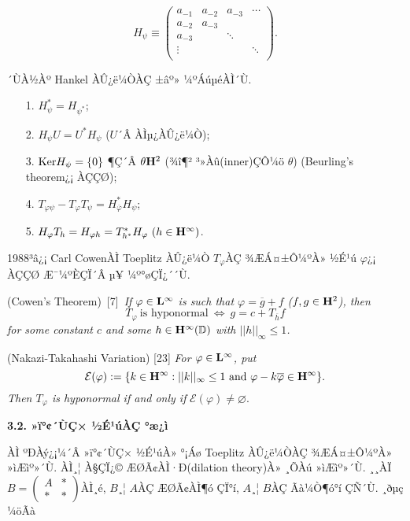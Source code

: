 \documentclass[12pt,a4paper,2sided]{article}
\newcommand{\vs}{\vspace}
\begin{document}
$$
H_\psi \equiv
\begin{pmatrix}
a_{-1}&a_{-2}&a_{-3}&\cdots\\
a_{-2}&a_{-3}& & \\
a_{-3}& &\ddots&  \\
\vdots& & &\ddots \\
\end{pmatrix}.
$$

´ÙÀ½Àº Hankel ÀÛ¿ë¼ÒÀÇ ±âº» ¼ºÁúµéÀÌ´Ù.
\begin{itemize}
\item[1.]  $H_{\psi}^*=H_{{\psi}^*}$;
\item[2.]  $H_{\psi}U=U^*H_{\psi}$ ($U$´Â ÀÌµ¿ÀÛ¿ë¼Ò);
\item[3.]  ${\rm Ker}H_{\psi}=\{0\}$ ¶Ç´Â $\theta{\bold H}^2$ (¾î¶² ³»Àû(inner)ÇÔ¼ö $\theta$) (Beurling's theorem¿¡ ÀÇÇØ);
\item[4.]  $T_{\varphi\psi}-T_{\varphi}T_{\psi}=H_{\overline{\varphi}}^*H_{\psi}$;
\item[5.]  $H_{\varphi}T_{h}=H_{\varphi h}=T_{h^*}^*H_{\varphi}\ (h\in{\bold H}^{\infty})$.
\end{itemize}

1988³â¿¡ Carl CowenÀÌ Toeplitz ÀÛ¿ë¼Ò $T_\varphi$ÀÇ ¾ÆÁ¤±Ô¼ºÀ» ½É¹ú
$\varphi$¿¡ ÀÇÇØ Æ¯¼ºÈ­ÇÏ´Â µ¥ ¼º°øÇÏ¿´´Ù.

\vs{0.2cm}{\bf Theorem 3.1.3.} (Cowen's Theorem)\ [7]\ {\sl If
$\varphi\in{\bold L}^{\infty}$ is such that \linebreak
$\varphi=\overline{g} +f$ {\rm (}$f,g\in {\bold H}^2${\rm )}, then
$$
T_\varphi\ \mbox{is hyponormal}\ \Longleftrightarrow\ g=c+T_{\overline{h}}f
$$
for some constant $c$ and some $h\in{\bold
H}^{\infty}(\mathbb{D})$ with $||h||_{\infty}\le 1$.}


\vs{0.2cm}{\bf Theorem 3.1.4.} (Nakazi-Takahashi Variation) [23]
{\sl For $\varphi\in{\bold L}^{\infty}$, put
$$
\mathcal{E} (\varphi):=\{k\in{\bold H}^{\infty}:||k||_{\infty}\le 1\
\mbox{and}\ \varphi-k{\overline{\varphi}}\in{\bold H}^{\infty}\}.
$$
Then $T_\varphi$ is hyponormal if and only if} $\mathcal{E}
(\varphi)\neq\varnothing$.


\vspace{.3 cm}

{\bf 3.2. »ï°¢´ÙÇ× ½É¹úÀÇ °æ¿ì} \vspace{.3 cm}

ÀÌ ºÐÀý¿¡¼­´Â »ï°¢´ÙÇ× ½É¹úÀ» °¡Áø Toeplitz ÀÛ¿ë¼ÒÀÇ ¾ÆÁ¤±Ô¼ºÀ»
»ìÆìº»´Ù. ÀÌ¸¦ À§ÇÏ¿©  ÆØÃ¢ÀÌ·Ð(dilation theory)À» ¸ÕÀú »ìÆìº»´Ù.
¸¸ÀÏ $B=\begin{pmatrix} A&*\\ *&* \end{pmatrix}$ÀÌ¸é, $B$¸¦ $A$ÀÇ
ÆØÃ¢ÀÌ¶ó ÇÏ°í, $A$¸¦ $B$ÀÇ Ãà¼Ò¶ó°í ÇÑ´Ù. ¸ðµç ¼öÃà \linebreak
\end{document}
